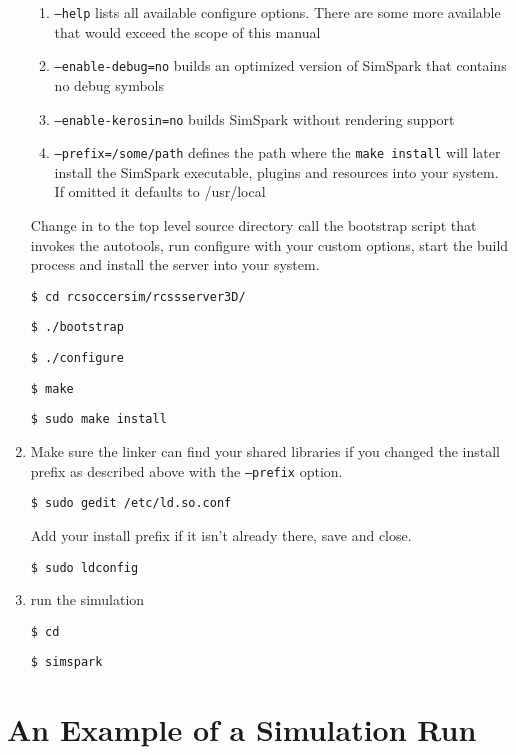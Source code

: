 \begin{enumerate}
\begin{enumerate}
\item \texttt{--help} lists all available configure options. There are some more available 
that would exceed the scope of this manual

\item \texttt{--enable-debug=no} builds an optimized version of SimSpark 
that contains no debug symbols

\item \texttt{--enable-kerosin=no} builds SimSpark without rendering support

\item \texttt{--prefix=/some/path} defines the path where the \texttt{make install} will later 
install the SimSpark executable, plugins and resources into your
system. If omitted it defaults to /usr/local

\end{enumerate}

Change in to the top level source directory call the bootstrap script
that invokes the autotools, run configure with your custom options,
start the build process and install the server into your system.

\texttt{\$ cd rcsoccersim/rcssserver3D/}

\texttt{\$ ./bootstrap}

\texttt{\$ ./configure}

\texttt{\$ make}

\texttt{\$ sudo make install}

\item Make sure the linker can find your shared libraries if you changed
the install prefix as described above with the \texttt{--prefix}
option.

\texttt{\$ sudo gedit /etc/ld.so.conf}

Add your install prefix if it isn't already there, save and close.

\texttt{\$ sudo ldconfig}

\item run the simulation

{\texttt{\$ cd}}

{\texttt{\$ simspark}}

\end{enumerate}

\section{An Example of a Simulation Run}



